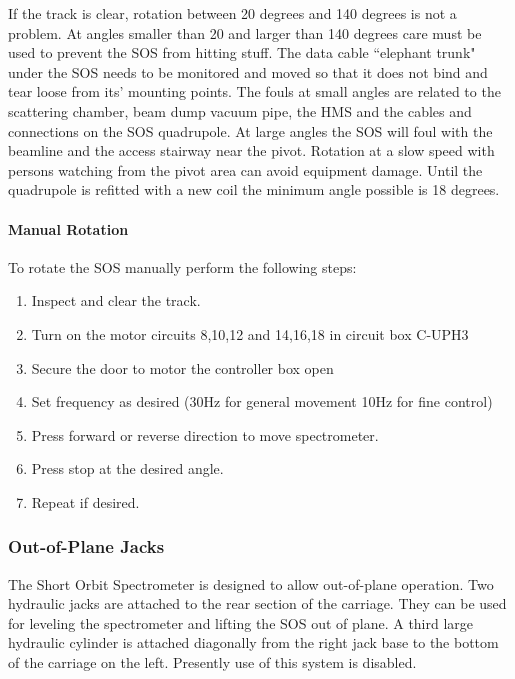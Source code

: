 If the track is clear, rotation between 20 degrees and 140 degrees is not a
problem. At angles smaller than 20 and larger than 140 degrees care must
be used to prevent the SOS from hitting stuff. The data cable ``elephant
trunk" under the SOS needs to be monitored and moved so that it does not
bind and tear loose from its' mounting points. The fouls at small angles are
related to the scattering chamber, beam dump vacuum pipe, the HMS and
the cables and connections on the SOS quadrupole. At large angles the
SOS will foul with the beamline and the access stairway near the pivot.
Rotation at a slow speed with persons watching from the pivot area can
avoid equipment damage. Until the quadrupole is refitted with a new coil
the minimum angle possible is 18 degrees.

\paragraph{Manual Rotation}

To rotate the SOS manually perform the following steps:

\begin{enumerate}
\item{Inspect and clear the track.}
\item{Turn on the motor circuits 8,10,12 and 14,16,18 in circuit box C-UPH3}
\item{Secure the door to motor the controller box open}
\item{Set frequency as desired (30Hz for general movement 10Hz for fine
control)}
\item{Press forward or reverse direction to move spectrometer.}
\item{Press stop at the desired angle.}
\item{Repeat if desired.}
\end{enumerate}




\subsubsection{Out-of-Plane Jacks}

The Short Orbit Spectrometer is designed to allow out-of-plane operation.
Two hydraulic jacks are attached to the rear section of the carriage. They
can be used for leveling the spectrometer and lifting the SOS out of plane. A
third large hydraulic cylinder is attached diagonally from the right jack
base to the bottom of the carriage on the left.  Presently use of
this system is disabled.

